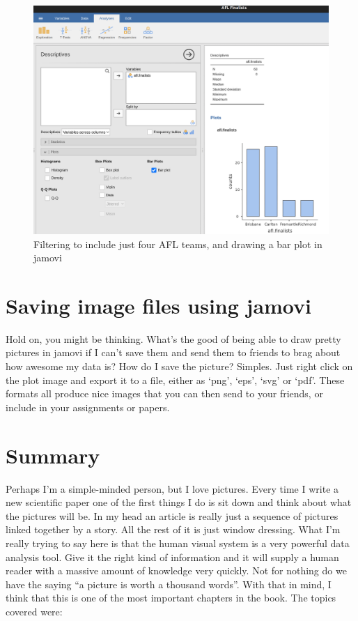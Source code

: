 \documentclass[
  a4paper,
]{book}
\begin{document}
\begin{figure}

\includegraphics[width=1\textwidth,height=\textheight]{images/fig5-11.png} \hfill{}

\caption{\label{fig-fig5-11}Filtering to include just four AFL teams,
and drawing a bar plot in jamovi}

\end{figure}

\hypertarget{saving-image-files-using-jamovi}{%
\section{Saving image files using
jamovi}\label{saving-image-files-using-jamovi}}

Hold on, you might be thinking. What's the good of being able to draw
pretty pictures in jamovi if I can't save them and send them to friends
to brag about how awesome my data is? How do I save the picture?
Simples. Just right click on the plot image and export it to a file,
either as `png', `eps', `svg' or `pdf'. These formats all produce nice
images that you can then send to your friends, or include in your
assignments or papers.

\hypertarget{summary-3}{%
\section{Summary}\label{summary-3}}

Perhaps I'm a simple-minded person, but I love pictures. Every time I
write a new scientific paper one of the first things I do is sit down
and think about what the pictures will be. In my head an article is
really just a sequence of pictures linked together by a story. All the
rest of it is just window dressing. What I'm really trying to say here
is that the human visual system is a very powerful data analysis tool.
Give it the right kind of information and it will supply a human reader
with a massive amount of knowledge very quickly. Not for nothing do we
have the saying ``a picture is worth a thousand words''. With that in
mind, I think that this is one of the most important chapters in the
book. The topics covered were:
\end{document}
